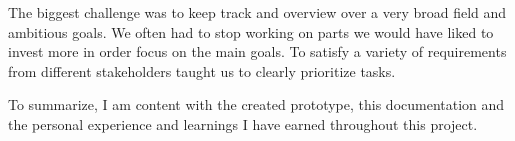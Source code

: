 The biggest challenge was to keep track and overview over a very broad field and ambitious goals. We often had to stop working on parts we would have liked to invest more in order focus on the main goals. To satisfy a variety of requirements from different stakeholders taught us to clearly prioritize tasks. 

To summarize, I am content with the created prototype, this documentation and the personal experience and learnings I have earned throughout this project. 


